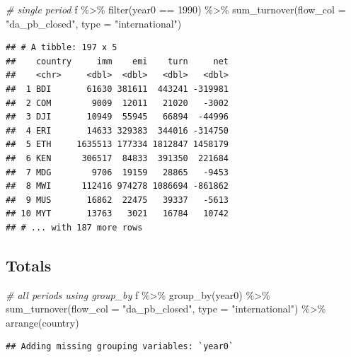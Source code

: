 \documentclass[
]{book}
\newenvironment{Shaded}{\begin{snugshade}}{\end{snugshade}}
\newcommand{\AttributeTok}[1]{\textcolor[rgb]{0.77,0.63,0.00}{#1}}
\newcommand{\CommentTok}[1]{\textcolor[rgb]{0.56,0.35,0.01}{\textit{#1}}}
\newcommand{\DecValTok}[1]{\textcolor[rgb]{0.00,0.00,0.81}{#1}}
\newcommand{\FunctionTok}[1]{\textcolor[rgb]{0.00,0.00,0.00}{#1}}
\newcommand{\NormalTok}[1]{#1}
\newcommand{\SpecialCharTok}[1]{\textcolor[rgb]{0.00,0.00,0.00}{#1}}
\newcommand{\StringTok}[1]{\textcolor[rgb]{0.31,0.60,0.02}{#1}}
\begin{document}
\begin{Shaded}
\begin{Highlighting}[]
\CommentTok{\# single period}
\NormalTok{f }\SpecialCharTok{\%\textgreater{}\%} 
  \FunctionTok{filter}\NormalTok{(year0 }\SpecialCharTok{==} \DecValTok{1990}\NormalTok{) }\SpecialCharTok{\%\textgreater{}\%}
  \FunctionTok{sum\_turnover}\NormalTok{(}\AttributeTok{flow\_col =} \StringTok{"da\_pb\_closed"}\NormalTok{, }\AttributeTok{type =} \StringTok{"international"}\NormalTok{)}
\end{Highlighting}
\end{Shaded}

\begin{verbatim}
## # A tibble: 197 x 5
##    country     imm    emi    turn     net
##    <chr>     <dbl>  <dbl>   <dbl>   <dbl>
##  1 BDI       61630 381611  443241 -319981
##  2 COM        9009  12011   21020   -3002
##  3 DJI       10949  55945   66894  -44996
##  4 ERI       14633 329383  344016 -314750
##  5 ETH     1635513 177334 1812847 1458179
##  6 KEN      306517  84833  391350  221684
##  7 MDG        9706  19159   28865   -9453
##  8 MWI      112416 974278 1086694 -861862
##  9 MUS       16862  22475   39337   -5613
## 10 MYT       13763   3021   16784   10742
## # ... with 187 more rows
\end{verbatim}

\hypertarget{totals-4}{%
\subsection{Totals}\label{totals-4}}

\begin{Shaded}
\begin{Highlighting}[]
\CommentTok{\# all periods using group\_by}
\NormalTok{f }\SpecialCharTok{\%\textgreater{}\%} 
  \FunctionTok{group\_by}\NormalTok{(year0) }\SpecialCharTok{\%\textgreater{}\%}
  \FunctionTok{sum\_turnover}\NormalTok{(}\AttributeTok{flow\_col =} \StringTok{"da\_pb\_closed"}\NormalTok{, }\AttributeTok{type =} \StringTok{"international"}\NormalTok{) }\SpecialCharTok{\%\textgreater{}\%}
  \FunctionTok{arrange}\NormalTok{(country)}
\end{Highlighting}
\end{Shaded}

\begin{verbatim}
## Adding missing grouping variables: `year0`
\end{verbatim}
\end{document}
